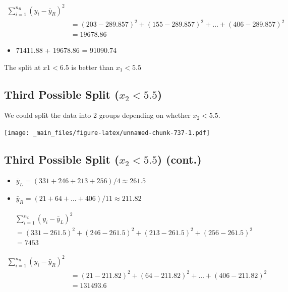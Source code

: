 \documentclass[]{book}
\providecommand{\tightlist}{%
  \setlength{\itemsep}{0pt}\setlength{\parskip}{0pt}}
\begin{document}
\[
\begin{aligned}
\displaystyle\sum_{i=1}^{n_R} (y_i -\bar{y}_R)^2 \\
& =(203-289.857)^2+(155-289.857)^2 + \ldots+(406-289.857)^2 \\
& =19678.86
\end{aligned}
\]

\begin{itemize}
\tightlist
\item
  71411.88 + 19678.86 = 91090.74
\end{itemize}

The split at \(x1 < 6.5\) is better than \(x_1<5.5\)

\subsection{\texorpdfstring{Third Possible Split
(\(x_2 < 5.5\))}{Third Possible Split (x\_2 \textless{} 5.5)}}\label{third-possible-split-x_2-5.5}

We could split the data into 2 groups depending on whether
\(x_2 < 5.5\).

\texttt{[image: \_main\_files/figure-latex/unnamed-chunk-737-1.pdf]}

\subsection{\texorpdfstring{Third Possible Split (\(x_2 < 5.5\))
(cont.)}{Third Possible Split (x\_2 \textless{} 5.5) (cont.)}}\label{third-possible-split-x_2-5.5-cont.}

\begin{itemize}
\tightlist
\item
  \(\bar{y}_L = (331+246+213+256)/4 \approx 261.5\)\\
\item
  \(\bar{y}_R = (21 + 64 + \ldots + 406)/11 \approx 211.82\)
\end{itemize}

\[
\begin{aligned}
& \displaystyle\sum_{i=1}^{n_L} (y_i -\bar{y}_L)^2  \\
& =(331-261.5)^2+(246-261.5)^2 + (213-261.5)^2+(256-261.5)^2 \\
& =7453
\end{aligned}
\]

\[
\begin{aligned}
\displaystyle\sum_{i=1}^{n_R} (y_i -\bar{y}_R)^2 \\
& =(21-211.82)^2+(64-211.82)^2 + \ldots+(406-211.82)^2 \\
& =131493.6
\end{aligned}
\]
\end{document}
